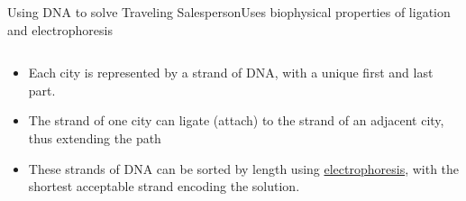\begin{frame}{Using DNA to solve Traveling Salesperson}{Uses biophysical properties of ligation and electrophoresis}
    
\begin{columns}
    \begin{column}{0.5\textwidth}
        \begin{itemize}
            \item<1-> Each city is represented by a strand of DNA, with a unique first and last part.
            \item<2-> The strand of one city can ligate (attach) to the strand of an adjacent city, thus extending the path
            \item<3-> These strands of DNA can be sorted by length using \href{https://en.wikipedia.org/wiki/Gel_electrophoresis}{electrophoresis}, with the shortest acceptable strand encoding the solution.
        \end{itemize}
 
    \end{column}
\end{columns}
\end{frame}
